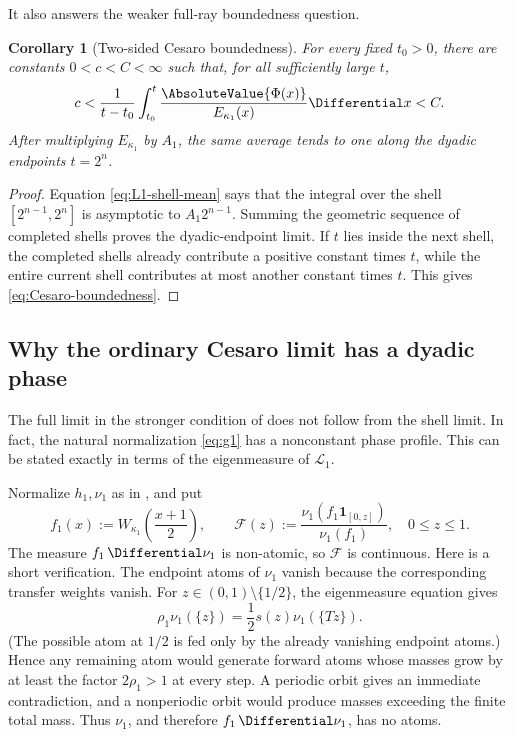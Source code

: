 \documentclass[11pt,oneside]{article}
\newtheorem{corollary}[theorem]{Corollary}
\theoremstyle{definition}
\theoremstyle{remark}
\newcommand{\Phiup}{\Phi}
\begin{document}
It also answers the weaker full-ray boundedness question.

\begin{corollary}[Two-sided Cesaro boundedness]
\label{cor:Cesaro-boundedness}
For every fixed $t_0>0$, there are constants $0<c<C<\infty$ such that, for all sufficiently
large $t$,
\begin{equation}
 c<\frac1{t-t_0}\int_{t_0}^{t}
 \frac{\AbsoluteValue{\Phiup(x)}}{E_{\kappa_1}(x)}\Differential x<C.
 \label{eq:Cesaro-boundedness}
\end{equation}
After multiplying $E_{\kappa_1}$ by $A_1$, the same average tends to one along the dyadic
endpoints $t=2^n$.
\end{corollary}

\begin{proof}
Equation \eqref{eq:L1-shell-mean} says that the integral over the shell
$[2^{n-1},2^n]$ is asymptotic to $A_1 2^{n-1}$.  Summing the geometric sequence of completed
shells proves the dyadic-endpoint limit.  If $t$ lies inside the next shell, the completed
shells already contribute a positive constant times $t$, while the entire current shell
contributes at most another constant times $t$.  This gives \eqref{eq:Cesaro-boundedness}.
\end{proof}

\subsection{Why the ordinary Cesaro limit has a dyadic phase}
\label{subsec:phase-profile}

The full limit in the stronger condition of \cite{mse-decay} does not follow from the shell
limit.  In fact, the natural normalization \eqref{eq:g1} has a nonconstant phase profile.
This can be stated exactly in terms of the eigenmeasure of $\mathcal L_1$.

Normalize $h_1,\nu_1$ as in , and put
\[
 f_1(x):=W_{\kappa_1}\!\left(\frac{x+1}{2}\right),
 \qquad
 \mathscr F(z):=
 \frac{\nu_1(f_1\mathbf1_{[0,z]})}{\nu_1(f_1)},
 \quad 0\le z\le1.
 \label{eq:phase-distribution}
\]
The measure $f_1\,\Differential\nu_1$ is non-atomic, so $\mathscr F$ is continuous.  Here is a
short verification.  The endpoint atoms of $\nu_1$ vanish because the corresponding
transfer weights vanish.  For $z\in(0,1)\setminus\{1/2\}$, the eigenmeasure equation gives
\[
 \rho_1\nu_1(\{z\})=\frac12s(z)\nu_1(\{Tz\}).
\]
(The possible atom at $1/2$ is fed only by the already vanishing endpoint atoms.)  Hence any
remaining atom would generate forward atoms whose masses grow by at least the factor
$2\rho_1>1$ at every step.  A periodic orbit gives an immediate contradiction, and a
nonperiodic orbit would produce masses exceeding the finite total mass.  Thus $\nu_1$, and
therefore $f_1\,\Differential\nu_1$, has no atoms.
\end{document}
